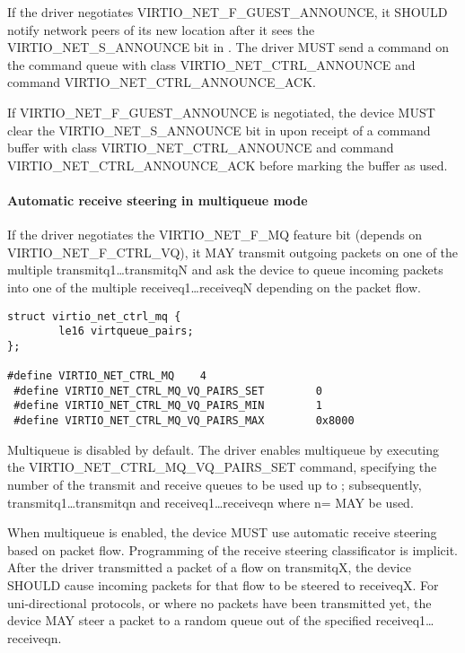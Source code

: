 
If the driver negotiates VIRTIO_NET_F_GUEST_ANNOUNCE, it SHOULD notify
network peers of its new location after it sees the VIRTIO_NET_S_ANNOUNCE bit
in .  The driver MUST send a command on the command queue
with class VIRTIO_NET_CTRL_ANNOUNCE and command VIRTIO_NET_CTRL_ANNOUNCE_ACK.


If VIRTIO_NET_F_GUEST_ANNOUNCE is negotiated, the device MUST clear the
VIRTIO_NET_S_ANNOUNCE bit in  upon receipt of a command buffer
with class VIRTIO_NET_CTRL_ANNOUNCE and command VIRTIO_NET_CTRL_ANNOUNCE_ACK
before marking the buffer as used.

\paragraph{Automatic receive steering in multiqueue mode}\label{sec:Device Types / Network Device / Device Operation / Control Virtqueue / Automatic receive steering in multiqueue mode}

If the driver negotiates the VIRTIO_NET_F_MQ feature bit (depends
on VIRTIO_NET_F_CTRL_VQ), it MAY transmit outgoing packets on one
of the multiple transmitq1\ldots transmitqN and ask the device to
queue incoming packets into one of the multiple receiveq1\ldots receiveqN
depending on the packet flow.

\begin{lstlisting}
struct virtio_net_ctrl_mq {
        le16 virtqueue_pairs;
};

#define VIRTIO_NET_CTRL_MQ    4
 #define VIRTIO_NET_CTRL_MQ_VQ_PAIRS_SET        0
 #define VIRTIO_NET_CTRL_MQ_VQ_PAIRS_MIN        1
 #define VIRTIO_NET_CTRL_MQ_VQ_PAIRS_MAX        0x8000
\end{lstlisting}

Multiqueue is disabled by default. The driver enables multiqueue by
executing the VIRTIO_NET_CTRL_MQ_VQ_PAIRS_SET command, specifying
the number of the transmit and receive queues to be used up to
; subsequently,
transmitq1\ldots transmitqn and receiveq1\ldots receiveqn where
n= MAY be used.

When multiqueue is enabled, the device MUST use automatic receive steering
based on packet flow. Programming of the receive steering
classificator is implicit. After the driver transmitted a packet of a
flow on transmitqX, the device SHOULD cause incoming packets for that flow to
be steered to receiveqX. For uni-directional protocols, or where
no packets have been transmitted yet, the device MAY steer a packet
to a random queue out of the specified receiveq1\ldots receiveqn.

